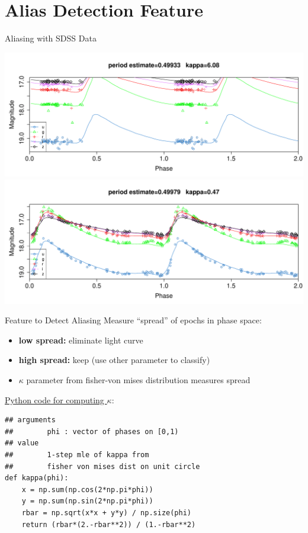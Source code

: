 \documentclass[12pt]{beamer}
\begin{document}
\section{Alias Detection Feature}

\begin{frame}{Aliasing with SDSS Data}

  \begin{center}
  \includegraphics[scale=0.3]{figs/alias_not_rr.pdf}\\
  \includegraphics[scale=0.3]{figs/alias_rr_rr.pdf}
  \end{center}
  
\end{frame}




\begin{frame}[fragile]{Feature to Detect Aliasing}
Measure ``spread'' of epochs in phase space:
    \begin{itemize}
    \item \textbf{low spread:} eliminate light curve
    \item \textbf{high spread:} keep (use other parameter to classify)
    \item $\kappa$ parameter from fisher-von mises distribution measures spread
  \end{itemize}

\vspace{.1in}
    
\underline{Python code for computing $\kappa$}:
\begin{verbatim}
## arguments
##        phi : vector of phases on [0,1)
## value
##        1-step mle of kappa from
##        fisher von mises dist on unit circle
def kappa(phi):
    x = np.sum(np.cos(2*np.pi*phi))
    y = np.sum(np.sin(2*np.pi*phi))
    rbar = np.sqrt(x*x + y*y) / np.size(phi)
    return (rbar*(2.-rbar**2)) / (1.-rbar**2)
\end{verbatim}

\end{frame}
\end{document}
